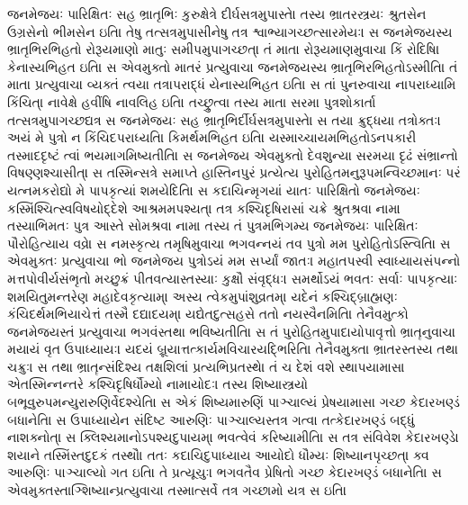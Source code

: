 \documentclass[a4paper,12pt]{article}
\begin{document}

જનમેજયઃ પારિક્ષિતઃ સહ ભ્રાતૃભિઃ કુરુક્ષેત્રે દીર્ઘસત્રમુપાસ્તે। તસ્ય ભ્રાતરસ્ત્રયઃ શ્રુતસેન ઉગ્રસેનો ભીમસેન ઇતિ।
તેષુ તત્સત્રમુપાસીનેષુ તત્ર શ્વાભ્યાગચ્છત્સારમેયઃ। સ જનમેજયસ્ય ભ્રાતૃભિરભિહતો રોરૂયમાણો માતુઃ સમીપમુપાગચ્છત્।
તં માતા રોરૂયમાણમુવાચ। કિં રોદિષિ। કેનાસ્યભિહત ઇતિ।
સ એવમુક્તો માતરં પ્રત્યુવાચ। જનમેજયસ્ય ભ્રાતૃભિરભિહતોઽસ્મીતિ।
તં માતા પ્રત્યુવાચ। વ્યક્તં ત્વયા તત્રાપરાદ્ધં યેનાસ્યભિહત ઇતિ।
સ તાં પુનરુવાચ। નાપરાધ્યામિ કિંચિત્। નાવેક્ષે હવીંષિ નાવલિહ ઇતિ।
તચ્છ્રુત્વા તસ્ય માતા સરમા પુત્રશોકાર્તા તત્સત્રમુપાગચ્છદ્યત્ર સ જનમેજયઃ સહ ભ્રાતૃભિર્દીર્ઘસત્રમુપાસ્તે।
સ તયા ક્રુદ્ધયા તત્રોક્તઃ। અયં મે પુત્રો ન કિંચિદપરાધ્યતિ। કિમર્થમભિહત ઇતિ। યસ્માચ્ચાયમભિહતોઽનપકારી તસ્માદદૃષ્ટં ત્વાં ભયમાગમિષ્યતીતિ।
સ જનમેજય એવમુક્તો દેવશુન્યા સરમયા દૃઢં સંભ્રાન્તો વિષણ્ણશ્ચાસીત્।
સ તસ્મિન્સત્રે સમાપ્તે હાસ્તિનપુરં પ્રત્યેત્ય પુરોહિતમનુરૂપમન્વિચ્છમાનઃ પરં યત્નમકરોદ્યો મે પાપકૃત્યાં શમયેદિતિ।
સ કદાચિન્મૃગયાં યાતઃ પારિક્ષિતો જનમેજયઃ કસ્મિંશ્ચિત્સ્વવિષયોદ્દેશે આશ્રમમપશ્યત્।
તત્ર કશ્ચિદૃષિરાસાં ચક્રે શ્રુતશ્રવા નામ। તસ્યાભિમતઃ પુત્ર આસ્તે સોમશ્રવા નામ।
તસ્ય તં પુત્રમભિગમ્ય જનમેજયઃ પારિક્ષિતઃ પૌરોહિત્યાય વવ્રે।
સ નમસ્કૃત્ય તમૃષિમુવાચ। ભગવન્નયં તવ પુત્રો મમ પુરોહિતોઽસ્ત્વિતિ।
સ એવમુક્તઃ પ્રત્યુવાચ। ભો જનમેજય પુત્રોઽયં મમ સર્પ્યાં જાતઃ। મહાતપસ્વી સ્વાધ્યાયસંપન્નો મત્તપોવીર્યસંભૃતો મચ્છુક્રં પીતવત્યાસ્તસ્યાઃ કુક્ષૌ સંવૃદ્ધઃ। સમર્થોઽયં ભવતઃ સર્વાઃ પાપકૃત્યાઃ શમયિતુમન્તરેણ મહાદેવકૃત્યામ્। અસ્ય ત્વેકમુપાંશુવ્રતમ્। યદેનં કશ્ચિદ્બ્રાહ્મણઃ કંચિદર્થમભિયાચેત્તં તસ્મૈ દદ્યાદયમ્। યદ્યેતદુત્સહસે તતો નયસ્વૈનમિતિ।
તેનૈવમુત્કો જનમેજયસ્તં પ્રત્યુવાચ। ભગવંસ્તથા ભવિષ્યતીતિ।
સ તં પુરોહિતમુપાદાયોપાવૃત્તો ભ્રાતૄનુવાચ। મયાયં વૃત ઉપાધ્યાયઃ। યદયં બ્રૂયાત્તત્કાર્યમવિચારયદ્ભિરિતિ।
તેનૈવમુક્તા ભ્રાતરસ્તસ્ય તથા ચક્રુઃ। સ તથા ભ્રાતૄન્સંદિશ્ય તક્ષશિલાં પ્રત્યભિપ્રતસ્થે। તં ચ દેશં વશે સ્થાપયામાસ।
એતસ્મિન્નન્તરે કશ્ચિદૃષિર્ધૌમ્યો નામાયોદઃ। તસ્ય શિષ્યાસ્ત્રયો બભૂવુરુપમન્યુરારુણિર્વેદશ્ચેતિ।
સ એકં શિષ્યમારુણિં પાઞ્ચાલ્યં પ્રેષયામાસ। ગચ્છ કેદારખણ્ડં બધાનેતિ।
સ ઉપાધ્યાયેન સંદિષ્ટ આરુણિઃ પાઞ્ચાલ્યસ્તત્ર ગત્વા તત્કેદારખણ્ડં બદ્ધું નાશક્નોત્।
સ ક્લિશ્યમાનોઽપશ્યદુપાયમ્। ભવત્વેવં કરિષ્યામીતિ।
સ તત્ર સંવિવેશ કેદારખણ્ડે। શયાને તસ્મિંસ્તદુદકં તસ્થૌ।
તતઃ કદાચિદુપાધ્યાય આયોદો ધૌમ્યઃ શિષ્યાનપૃચ્છત્। ક્વ આરુણિઃ પાઞ્ચાલ્યો ગત ઇતિ।
તે પ્રત્યૂચુઃ। ભગવતૈવ પ્રેષિતો ગચ્છ કેદારખણ્ડં બધાનેતિ।
સ એવમુક્તસ્તાઞ્શિષ્યાન્પ્રત્યુવાચ। તસ્માત્સર્વે તત્ર ગચ્છામો યત્ર સ ઇતિ।
\end{document}
